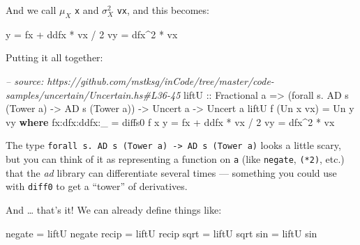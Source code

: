 \documentclass[]{article}
\newenvironment{Shaded}{}{}
\newcommand{\KeywordTok}[1]{\textcolor[rgb]{0.00,0.44,0.13}{\textbf{{#1}}}}
\newcommand{\DataTypeTok}[1]{\textcolor[rgb]{0.56,0.13,0.00}{{#1}}}
\newcommand{\DecValTok}[1]{\textcolor[rgb]{0.25,0.63,0.44}{{#1}}}
\newcommand{\CommentTok}[1]{\textcolor[rgb]{0.38,0.63,0.69}{\textit{{#1}}}}
\newcommand{\OtherTok}[1]{\textcolor[rgb]{0.00,0.44,0.13}{{#1}}}
\newcommand{\FunctionTok}[1]{\textcolor[rgb]{0.02,0.16,0.49}{{#1}}}
\newcommand{\NormalTok}[1]{{#1}}
\begin{document}
And we call \(\mu_X\) \texttt{x} and \(\sigma_X^2\) \texttt{vx}, and
this becomes:

\begin{Shaded}
\begin{Highlighting}[]
\NormalTok{y  }\FunctionTok{=} \NormalTok{fx }\FunctionTok{+} \NormalTok{ddfx }\FunctionTok{*} \NormalTok{vx }\FunctionTok{/} \DecValTok{2}
\NormalTok{vy }\FunctionTok{=} \NormalTok{dfx}\FunctionTok{^}\DecValTok{2} \FunctionTok{*} \NormalTok{vx}
\end{Highlighting}
\end{Shaded}

Putting it all together:

\begin{Shaded}
\begin{Highlighting}[]
\CommentTok{-- source: https://github.com/mstksg/inCode/tree/master/code-samples/uncertain/Uncertain.hs#L36-45}
\NormalTok{liftU}
\OtherTok{    ::} \DataTypeTok{Fractional} \NormalTok{a}
    \OtherTok{=>} \NormalTok{(forall s}\FunctionTok{.} \DataTypeTok{AD} \NormalTok{s (}\DataTypeTok{Tower} \NormalTok{a) }\OtherTok{->} \DataTypeTok{AD} \NormalTok{s (}\DataTypeTok{Tower} \NormalTok{a))}
    \OtherTok{->} \DataTypeTok{Uncert} \NormalTok{a}
    \OtherTok{->} \DataTypeTok{Uncert} \NormalTok{a}
\NormalTok{liftU f (}\DataTypeTok{Un} \NormalTok{x vx) }\FunctionTok{=} \DataTypeTok{Un} \NormalTok{y vy}
  \KeywordTok{where}
    \NormalTok{fx}\FunctionTok{:}\NormalTok{dfx}\FunctionTok{:}\NormalTok{ddfx}\FunctionTok{:}\NormalTok{_ }\FunctionTok{=} \NormalTok{diffs0 f x}
    \NormalTok{y             }\FunctionTok{=} \NormalTok{fx }\FunctionTok{+} \NormalTok{ddfx }\FunctionTok{*} \NormalTok{vx }\FunctionTok{/} \DecValTok{2}
    \NormalTok{vy            }\FunctionTok{=} \NormalTok{dfx}\FunctionTok{^}\DecValTok{2} \FunctionTok{*} \NormalTok{vx}
\end{Highlighting}
\end{Shaded}

The type
\texttt{forall\ s.\ AD\ s\ (Tower\ a)\ -\textgreater{}\ AD\ s\ (Tower\ a)}
looks a little scary, but you can think of it as representing a function
on \texttt{a} (like \texttt{negate}, \texttt{(*2)}, etc.) that the
\emph{ad} library can differentiate several times --- something you
could use with \texttt{diff0} to get a ``tower'' of derivatives.

And \ldots{} that's it! We can already define things like:

\begin{Shaded}
\begin{Highlighting}[]
\NormalTok{negate }\FunctionTok{=} \NormalTok{liftU negate}
\NormalTok{recip  }\FunctionTok{=} \NormalTok{liftU recip}
\NormalTok{sqrt   }\FunctionTok{=} \NormalTok{liftU sqrt}
\NormalTok{sin    }\FunctionTok{=} \NormalTok{liftU sin}
\end{Highlighting}
\end{Shaded}
\end{document}
